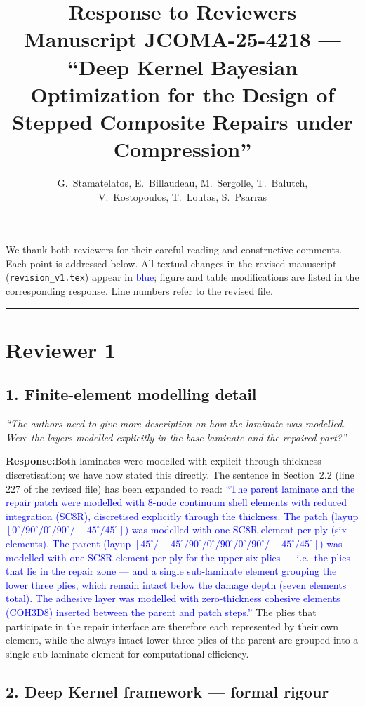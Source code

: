 \documentclass[11pt,a4paper]{article}
\title{Response to Reviewers\\\large Manuscript JCOMA-25-4218 ---
``Deep Kernel Bayesian Optimization for the Design of Stepped Composite Repairs under Compression''}
\author{G.~Stamatelatos, E.~Billaudeau, M.~Sergolle, T.~Balutch,\\
V.~Kostopoulos, T.~Loutas, S.~Psarras}
\date{}
\newcommand{\new}[1]{\textcolor{blue}{#1}}
\newcommand{\rev}[1]{\par\noindent\textit{\small #1}\par\smallskip}
\newcommand{\resp}{\par\noindent\textbf{Response:}\space}
\begin{document}
\maketitle

We thank both reviewers for their careful reading and constructive comments. Each point is addressed below. All textual changes in the revised manuscript (\texttt{revision\_v1.tex}) appear in \new{blue}; figure and table modifications are listed in the corresponding response. Line numbers refer to the revised file.

\medskip
\hrule
\medskip

\section*{Reviewer 1}

\subsection*{1. Finite-element modelling detail}
\rev{``The authors need to give more description on how the laminate was modelled. Were the layers modelled explicitly in the base laminate and the repaired part?''}
\resp Both laminates were modelled with explicit through-thickness discretisation; we have now stated this directly. The sentence in Section~2.2 (line 227 of the revised file) has been expanded to read: \new{``The parent laminate and the repair patch were modelled with 8-node continuum shell elements with reduced integration (SC8R), discretised explicitly through the thickness. The patch (layup $[0^\circ/90^\circ/0^\circ/90^\circ/-45^\circ/45^\circ]$) was modelled with one SC8R element per ply (six elements). The parent (layup $[45^\circ/-45^\circ/90^\circ/0^\circ/90^\circ/0^\circ/90^\circ/-45^\circ/45^\circ]$) was modelled with one SC8R element per ply for the upper six plies --- i.e.\ the plies that lie in the repair zone --- and a single sub-laminate element grouping the lower three plies, which remain intact below the damage depth (seven elements total). The adhesive layer was modelled with zero-thickness cohesive elements (COH3D8) inserted between the parent and patch steps.''} The plies that participate in the repair interface are therefore each represented by their own element, while the always-intact lower three plies of the parent are grouped into a single sub-laminate element for computational efficiency.

\subsection*{2. Deep Kernel framework --- formal rigour}
\end{document}
